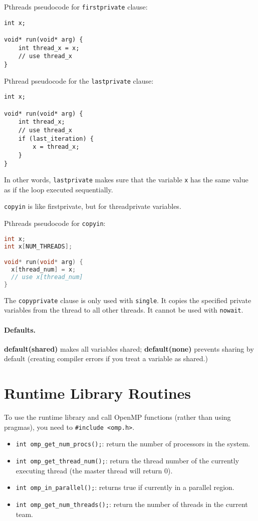 \newpage
Pthreads pseudocode for {\tt firstprivate} clause:
  \begin{lstlisting}
int x;

void* run(void* arg) {
    int thread_x = x;
    // use thread_x
}
  \end{lstlisting}

Pthread pseudocode for the {\tt lastprivate} clause:
  \begin{lstlisting}
int x;

void* run(void* arg) {
    int thread_x;
    // use thread_x
    if (last_iteration) {
        x = thread_x;
    }
}
  \end{lstlisting}
In other words, {\tt lastprivate} makes sure that the variable {\tt x}
has the same value as if the loop executed sequentially.

{\tt copyin} is like firstprivate, but for threadprivate variables.

Pthreads pseudocode for {\tt copyin}:
  \begin{lstlisting}[language=C]
int x;
int x[NUM_THREADS];

void* run(void* arg) {
  x[thread_num] = x;
  // use x[thread_num]
}
  \end{lstlisting}

The {\tt copyprivate} clause is only used with {\tt single}.
It copies the specified private variables from the thread to all other
threads. It cannot be used with {\tt nowait}.

\paragraph{Defaults.} {\bf default(shared)} makes all variables shared; 
{\bf default(none)} prevents sharing by default (creating compiler errors if
you treat a variable as shared.)

\section*{Runtime Library Routines}

To use the runtime library and call OpenMP functions (rather than
using pragmas), you need to {\tt \#include <omp.h>}.

  \begin{itemize}
    \item {\tt int omp\_get\_num\_procs();}: return the number of processors in the system.
    \item {\tt int omp\_get\_thread\_num();}: return the thread number of the currently executing thread (the master thread will return 0).
    \item {\tt int omp\_in\_parallel();}: returns true if currently in a parallel region.
    \item {\tt int omp\_get\_num\_threads();}: return the number of threads in the current team.
  \end{itemize}


